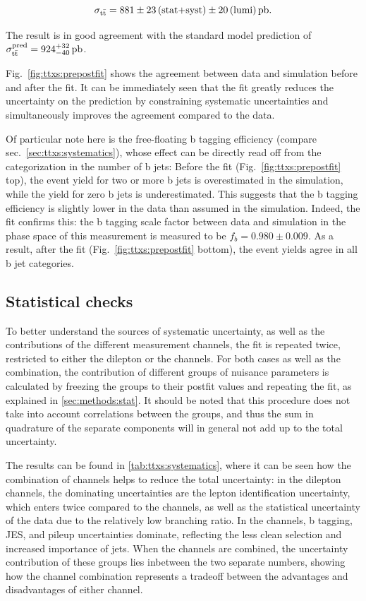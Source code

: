 \[
    \sigma_{\mathrm{t \bar{t}}} = 881 \pm 23 \, \text{(stat+syst)} \pm 20 \, \text{(lumi)} \, \text{pb}.
\]

The result is in good agreement with the standard model prediction of $\sigma_{\mathrm{t \bar{t}}}^{\text{pred}} = 924^{+32}_{-40} \, \text{pb}$.

Fig.~\ref{fig:ttxs:prepostfit} shows the agreement between data and simulation before and after the fit. It can be immediately seen that the fit greatly reduces the uncertainty on the prediction by constraining systematic uncertainties and simultaneously improves the agreement compared to the data. 

Of particular note here is the free-floating b tagging efficiency (compare sec.~\ref{sec:ttxs:systematics}), whose effect can be directly read off from the categorization in the number of b jets: Before the fit (Fig.~\ref{fig:ttxs:prepostfit} top), the event yield for two or more b jets is overestimated in the simulation, while the yield for zero b jets is underestimated. This suggests that the b tagging efficiency is slightly lower in the data than assumed in the simulation. Indeed, the fit confirms this: the b tagging scale factor between data and simulation in the phase space of this measurement is measured to be $f_b  = 0.980 \pm 0.009$. As a result, after the fit (Fig.~\ref{fig:ttxs:prepostfit} bottom), the event yields agree in all b jet categories.

\subsection{Statistical checks}

To better understand the sources of systematic uncertainty, as well as the contributions of the different measurement channels, the fit is repeated twice, restricted to either the dilepton or the \ljets channels. For both cases as well as the combination, the contribution of different groups of nuisance parameters is calculated by freezing the groups to their postfit values and repeating the fit, as explained in \cref{sec:methods:stat}. It should be noted that this procedure does not take into account correlations between the groups, and thus the sum in quadrature of the separate components will in general not add up to the total uncertainty.

The results can be found in \cref{tab:ttxs:systematics}, where it can be seen how the combination of channels helps to reduce the total uncertainty: in the dilepton channels, the dominating uncertainties are the lepton identification uncertainty, which enters twice compared to the \ljets channels, as well as the statistical uncertainty of the data due to the relatively low branching ratio. In the \ljets channels, b tagging, JES, and pileup uncertainties dominate, reflecting the less clean selection and increased importance of jets. When the channels are combined, the uncertainty contribution of these groups lies inbetween the two separate numbers, showing how the channel combination represents a tradeoff between the advantages and disadvantages of either channel.

